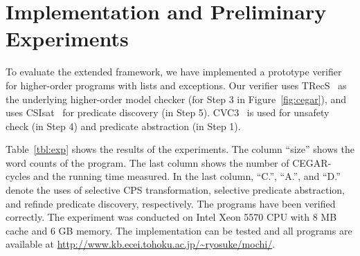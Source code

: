 
\section{Implementation and Preliminary Experiments}
\label{sec:experiments}

To evaluate the extended framework, we have implemented a prototype
verifier for higher-order programs with lists and exceptions.
Our verifier uses TRecS~\cite{KobayashiPOPL2009,KobayashiPPDP2009} as
the underlying higher-order model checker (for Step 3 in
Figure~\ref{fig:cegar}), and uses CSIsat~\cite{Beyer2008} for predicate
discovery (in Step 5).  CVC3~\cite{Barrett2007} is used for unsafety
check (in Step 4) and predicate abstraction (in Step 1).

Table~\ref{tbl:exp} shows the results of the experiments.  The column
``size'' shows the word counts of the program.  The last column shows
the number of CEGAR-cycles and the running time measured.  In the last
column, ``C.'', ``A.'', and ``D.''  denote the uses of selective CPS
transformation, selective predicate abstraction, and refinde predicate
discovery, respectively.  The programs have been verified correctly.
The experiment was conducted on Intel Xeon 5570 CPU with 8 MB cache and
6 GB memory.  The implementation can be tested and all programs are
available at \url{http://www.kb.ecei.tohoku.ac.jp/~ryosuke/mochi/}.

